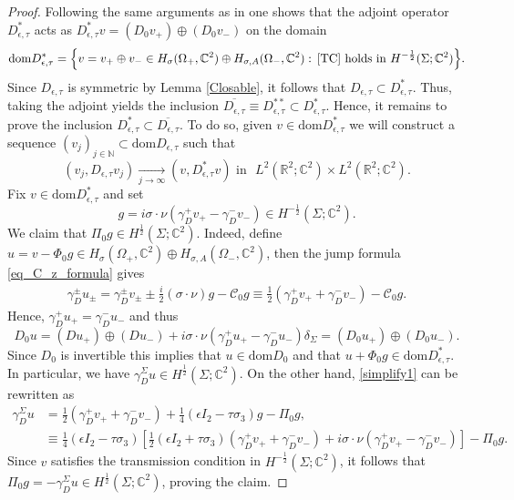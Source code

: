 \documentclass[11pt,a4paper,reqno,oneside]{amsproc}
\DeclareMathOperator{\dom}{dom}
\def \rr {{\mathbb R}}
\def \cc {{\mathbb C}}
\def \nn {{\mathbb N}}
\numberwithin{equation}{section}
\def\dom{\mathrm{dom}}
\def \cc {{\mathbb{C}}}
\begin{document}
\begin{proof} Following the same arguments as in \cite{BB1} one shows that the adjoint operator $D^{\ast}_{\epsilon,\tau}$ acts as  $D^\ast_{\epsilon,\tau}v = (D_0 v_+) \oplus (D_0 v_-)$ on the domain
\[
\dom D^\ast_{\epsilon,\tau} = \Big\{ v = v_+ \oplus v_- \in  H_\sigma(\Omega_+,\cc^2)\oplus H_{\sigma, A}(\Omega_-,\cc^2): 
           \, \eqref{TC} \text{ holds in } H^{-\frac{1}{2}}(\Sigma;\cc^2) \Big\}.
\]
Since $D_{\epsilon,\tau}$ is symmetric by Lemma \ref{Closable}, it follows that  $D_{\epsilon,\tau}\subset D^{\ast}_{\epsilon,\tau}$. Thus, taking the adjoint yields the inclusion $\overline{D_{\epsilon,\tau}}\equiv D^{\ast\ast}_{\epsilon,\tau}\subset D^{\ast}_{\epsilon,\tau}$. Hence, it remains to prove the inclusion $D^{\ast}_{\epsilon,\tau}\subset\overline{D_{\epsilon,\tau}}$. To do so, given $v\in \dom D^{\ast}_{\epsilon,\tau}$ we will construct a sequence  $(v_j)_{j\in\nn}\subset \dom D_{\epsilon,\tau}$ such that 
 \[
 (v_j, D_{\epsilon,\tau}v_j) \xrightarrow[j\to\infty]{} (v, D^\ast_{\epsilon,\tau}v) \,\,\text{in }\,\, L^2(\rr^2;\cc^2)\times L^2(\rr^2;\cc^2).
 \]
Fix $v\in \dom D^{\ast}_{\epsilon,\tau}$ and set 
\[
g=i\sigma\cdot\nu(\gamma_D^+ v_+-\gamma_D^- v_-)\in H^{-\frac{1}{2}}(\Sigma;\cc^2).
\]
We claim that $\Pi_0 g\in H^{\frac{1}{2}}(\Sigma;\cc^2)$. Indeed, define $u=v-\Phi_0g \in  H_\sigma(\Omega_+,\cc^2)\oplus H_{\sigma, A}(\Omega_-,\cc^2)$, then the jump formula \eqref{eq_C_z_formula} gives
\begin{align}\label{simplify1}
\gamma_D^\pm u_\pm= \gamma_D^\pm v_\pm \pm \frac{i}{2}(\sigma\cdot\nu) g -\mathscr{C}_0 g \equiv \frac{1}{2}(\gamma_D^+ v_+ +\gamma_D^- v_-) - \mathscr{C}_0 g.
\end{align}
Hence, $\gamma_D^+ u_+=\gamma_D^-u_-$ and thus
  \[
    D_0u= (D u_+)\oplus(D u_-) +i\sigma\cdot\nu(\gamma_D^+u_+-\gamma_D^-u_-)\delta_\Sigma=(D_0 u_+)\oplus(D_0 u_-).
    \]
Since $D_0$ is invertible this implies that  $u\in \dom D_0$ and that  $u+\Phi_0g \in \dom D^{\ast}_{\epsilon,\tau}$.
 In particular, we have $\gamma_D^\Sigma u \in H^{\frac{1}{2}}(\Sigma;\cc^2)$. On the other hand, \eqref{simplify1} can be rewritten as 
\begin{align*}
\gamma_D^\Sigma u&= \frac{1}{2}(\gamma_D^+ v_+ +\gamma_D^- v_-) + \frac{1}{4}(\epsilon I_2-\tau\sigma_3) g   -\Pi_0g,\\
&\equiv \frac{1}{4}(\epsilon I_2-\tau\sigma_3)\left[\frac{1}{2} (\epsilon I_2+\tau\sigma_3)(\gamma_D^+ v_+ +\gamma_D^- v_-) + i\sigma\cdot\nu(\gamma_D^+ v_+-\gamma_D^- v_-)\right]   -\Pi_0g.
\end{align*}
Since $v$ satisfies the transmission condition in $H^{-\frac{1}{2}}(\Sigma;\cc^2)$, it follows that $\Pi_0g=- \gamma_D^\Sigma u \in H^{\frac{1}{2}}(\Sigma;\cc^2)$, proving the claim.


\end{proof}
\end{document}
